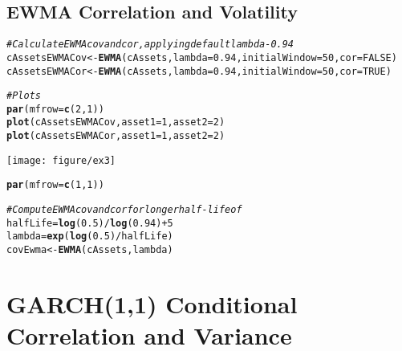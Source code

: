 \documentclass[a4paper]{article}\usepackage[]{graphicx}\usepackage[]{color}
\makeatletter
\def\maxwidth{ %
  \ifdim\Gin@nat@width>\linewidth
    \linewidth
  \else
    \Gin@nat@width
  \fi
}
\newcommand{\hlnum}[1]{\textcolor[rgb]{0.686,0.059,0.569}{#1}}%
\newcommand{\hlcom}[1]{\textcolor[rgb]{0.678,0.584,0.686}{\textit{#1}}}%
\newcommand{\hlopt}[1]{\textcolor[rgb]{0,0,0}{#1}}%
\newcommand{\hlstd}[1]{\textcolor[rgb]{0.345,0.345,0.345}{#1}}%
\newcommand{\hlkwb}[1]{\textcolor[rgb]{0.69,0.353,0.396}{#1}}%
\newcommand{\hlkwc}[1]{\textcolor[rgb]{0.333,0.667,0.333}{#1}}%
\newcommand{\hlkwd}[1]{\textcolor[rgb]{0.737,0.353,0.396}{\textbf{#1}}}%
\newenvironment{kframe}{%
 \def\at@end@of@kframe{}%
 \ifinner\ifhmode%
  \def\at@end@of@kframe{\end{minipage}}%
  \begin{minipage}{\columnwidth}%
 \fi\fi%
 \def\FrameCommand##1{\hskip\@totalleftmargin \hskip-\fboxsep
 \colorbox{shadecolor}{##1}\hskip-\fboxsep
     \hskip-\linewidth \hskip-\@totalleftmargin \hskip\columnwidth}%
 \MakeFramed {\advance\hsize-\width
   \@totalleftmargin\z@ \linewidth\hsize
   \@setminipage}}%
 {\par\unskip\endMakeFramed%
 \at@end@of@kframe}
\newenvironment{knitrout}{}{} %
\makeatother
\begin{document}
\subsection{EWMA Correlation and Volatility}
\begin{knitrout}
\color{fgcolor}\begin{kframe}
\begin{alltt}
\hlcom{# Calculate EWMA cov and cor, applying default lambda - 0.94}
\hlstd{cAssetsEWMACov} \hlkwb{<-} \hlkwd{EWMA}\hlstd{(cAssets,} \hlkwc{lambda} \hlstd{=} \hlnum{0.94}\hlstd{,} \hlkwc{initialWindow} \hlstd{=} \hlnum{50}\hlstd{,} \hlkwc{cor} \hlstd{=} \hlnum{FALSE}\hlstd{)}
\hlstd{cAssetsEWMACor} \hlkwb{<-} \hlkwd{EWMA}\hlstd{(cAssets,} \hlkwc{lambda} \hlstd{=} \hlnum{0.94}\hlstd{,} \hlkwc{initialWindow} \hlstd{=} \hlnum{50}\hlstd{,} \hlkwc{cor} \hlstd{=} \hlnum{TRUE}\hlstd{)}

\hlcom{# Plots}
\hlkwd{par}\hlstd{(}\hlkwc{mfrow} \hlstd{=} \hlkwd{c}\hlstd{(}\hlnum{2}\hlstd{,} \hlnum{1}\hlstd{))}
\hlkwd{plot}\hlstd{(cAssetsEWMACov,} \hlkwc{asset1} \hlstd{=} \hlnum{1}\hlstd{,} \hlkwc{asset2} \hlstd{=} \hlnum{2}\hlstd{)}
\hlkwd{plot}\hlstd{(cAssetsEWMACor,} \hlkwc{asset1} \hlstd{=} \hlnum{1}\hlstd{,} \hlkwc{asset2} \hlstd{=} \hlnum{2}\hlstd{)}
\end{alltt}
\end{kframe}
\texttt{[image: figure/ex3]} 
\begin{kframe}\begin{alltt}
\hlkwd{par}\hlstd{(}\hlkwc{mfrow} \hlstd{=} \hlkwd{c}\hlstd{(}\hlnum{1}\hlstd{,} \hlnum{1}\hlstd{))}

\hlcom{# Compute EWMA cov and cor for longer half-life of}
\hlstd{halfLife} \hlkwb{=} \hlkwd{log}\hlstd{(}\hlnum{0.5}\hlstd{)}\hlopt{/}\hlkwd{log}\hlstd{(}\hlnum{0.94}\hlstd{)} \hlopt{+} \hlnum{5}
\hlstd{lambda} \hlkwb{=} \hlkwd{exp}\hlstd{(}\hlkwd{log}\hlstd{(}\hlnum{0.5}\hlstd{)}\hlopt{/}\hlstd{halfLife)}
\hlstd{covEwma} \hlkwb{<-} \hlkwd{EWMA}\hlstd{(cAssets, lambda)}
\end{alltt}
\end{kframe}
\end{knitrout}


\section{GARCH(1,1) Conditional Correlation and Variance}
\end{document}

